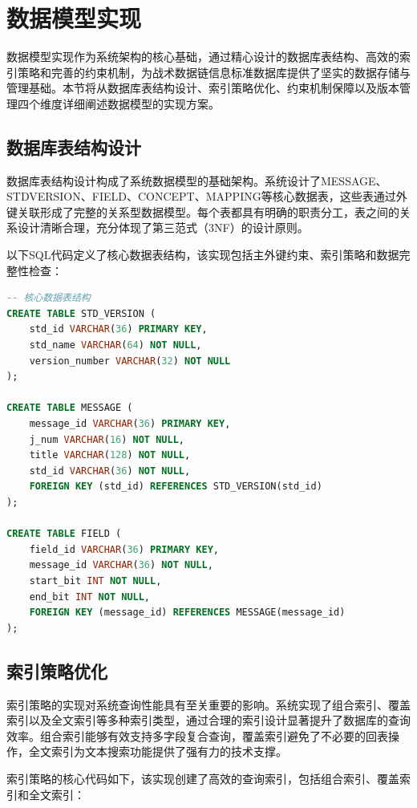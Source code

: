 \section{数据模型实现}

数据模型实现作为系统架构的核心基础，通过精心设计的数据库表结构、高效的索引策略和完善的约束机制，为战术数据链信息标准数据库提供了坚实的数据存储与管理基础。本节将从数据库表结构设计、索引策略优化、约束机制保障以及版本管理四个维度详细阐述数据模型的实现方案。

\subsection{数据库表结构设计}

数据库表结构设计构成了系统数据模型的基础架构。系统设计了MESSAGE、STDVERSION、FIELD、CONCEPT、MAPPING等核心数据表，这些表通过外键关联形成了完整的关系型数据模型。每个表都具有明确的职责分工，表之间的关系设计清晰合理，充分体现了第三范式（3NF）的设计原则。

以下SQL代码定义了核心数据表结构，该实现包括主外键约束、索引策略和数据完整性检查：

\begin{lstlisting}[language=SQL, label=fig:database_schema]
-- 核心数据表结构
CREATE TABLE STD_VERSION (
    std_id VARCHAR(36) PRIMARY KEY,
    std_name VARCHAR(64) NOT NULL,
    version_number VARCHAR(32) NOT NULL
);

CREATE TABLE MESSAGE (
    message_id VARCHAR(36) PRIMARY KEY,
    j_num VARCHAR(16) NOT NULL,
    title VARCHAR(128) NOT NULL,
    std_id VARCHAR(36) NOT NULL,
    FOREIGN KEY (std_id) REFERENCES STD_VERSION(std_id)
);

CREATE TABLE FIELD (
    field_id VARCHAR(36) PRIMARY KEY,
    message_id VARCHAR(36) NOT NULL,
    start_bit INT NOT NULL,
    end_bit INT NOT NULL,
    FOREIGN KEY (message_id) REFERENCES MESSAGE(message_id)
);
\end{lstlisting}

\subsection{索引策略优化}

索引策略的实现对系统查询性能具有至关重要的影响。系统实现了组合索引、覆盖索引以及全文索引等多种索引类型，通过合理的索引设计显著提升了数据库的查询效率。组合索引能够有效支持多字段复合查询，覆盖索引避免了不必要的回表操作，全文索引为文本搜索功能提供了强有力的技术支撑。

索引策略的核心代码如下，该实现创建了高效的查询索引，包括组合索引、覆盖索引和全文索引：

